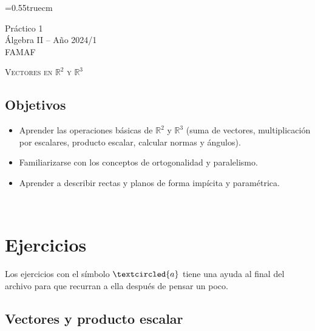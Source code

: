 \documentclass[a4paper,12pt,twoside,spanish,reqno]{amsbook}
\numberwithin{equation}{section}
\begin{document}
    \baselineskip=0.55truecm %
    
    
    {\bf \begin{center} Práctico 1 \\ Álgebra  II -- Año 2024/1 \\ FAMAF \end{center}}
    


\bigbreak


\centerline{\textsc{Vectores en $\mathbb R^2$ y $\mathbb R^3$}}


\bigbreak

\subsection*{Objetivos}

\begin{itemize}
 \item Aprender las operaciones b\'asicas de $\mathbb R^2$ y $\mathbb R^3$ (suma de vectores, multiplicaci\'on por escalares, producto escalar, calcular normas y \'angulos).
 \item Familiarizarse con los conceptos de ortogonalidad y paralelismo.
 \item Aprender a describir rectas y planos de forma imp\'icita y param\'etrica.
\end{itemize}

\

\section*{Ejercicios}

Los ejercicios con el s\'imbolo $\textcircled{a}$ tiene una ayuda al final del archivo para que recurran a ella despu\'es de pensar un poco.


\subsection*{Vectores y producto escalar}
\end{document}
